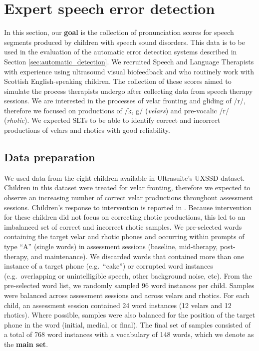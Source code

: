 \section{Expert speech error detection}
\label{sec:expert_detection}

In this section, our \textbf{goal} is the collection of pronunciation scores for speech segments produced by children with speech sound disorders.
This data is to be used in the evaluation of the automatic error detection systems described in Section \ref{sec:automatic_detection}.
We recruited Speech and Language Therapists with experience using ultrasound visual biofeedback 
and who routinely work with Scottish English-speaking children.
The collection of these scores aimed to simulate the process therapists undergo after collecting data from speech therapy sessions.
We are interested in the processes of velar fronting and gliding of /r/, therefore we focused on productions of /k, g/ (\textit{velars}) and pre-vocalic /r/ (\textit{rhotic}).
We expected SLTs to be able to identify correct and incorrect productions of velars and rhotics with good reliability.

\subsection{Data preparation}

We used data from the eight children available in Ultrasuite's UXSSD dataset.
Children in this dataset were treated for velar fronting, therefore we expected to observe an increasing number of correct velar productions throughout assessment sessions.
Children's response to intervention is reported in \citet{cleland2015using}.
Because intervention for these children did not focus on correcting rhotic productions, this led to an imbalanced set of correct and incorrect rhotic samples.
We pre-selected words containing the target velar and rhotic phones and occurring within prompts of type \enquote{A} (single words) in assessment sessions (baseline, mid-therapy, post-therapy, and maintenance).
We discarded words that contained more than one instance of a target phone (e.g.\ \enquote{cake}) or corrupted word instances (e.g.\ overlapping or unintelligible speech, other background noise, etc).
From the pre-selected word list, we randomly sampled 96 word instances per child.
Samples were balanced across assessment sessions and across velars and rhotics.
For each child, an assessment session contained 24 word instances (12 velars and 12 rhotics).
Where possible, samples were also balanced for the position of the target phone in the word (initial, medial, or final).
The final set of samples consisted of a total of 768 word instances with a vocabulary of 148 words, which
we denote as the \textbf{main set}.

